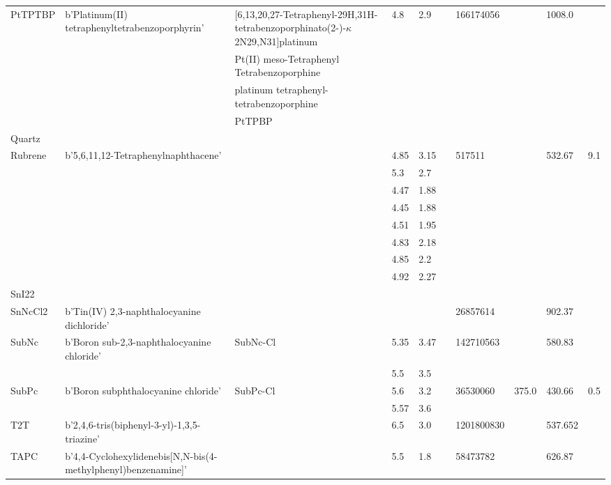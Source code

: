 \documentclass[../thesis.tex]{subfiles}
\begin{document}
\begin{landscape}
\begin{longtable}{| p{} | p{} | p{} | p{} | p{} | p{} | p{} | p{} | p{} | p{} | }
 \hline 
PtTPTBP & b'Platinum(II) tetraphenyltetrabenzoporphyrin' & [6,13,20,27-Tetraphenyl-29H,31H-tetrabenzoporphinato(2-)-$\kappa$2N29,N31]platinum & 4.8 & 2.9 &  & 166174056 &  & 1008.0 &  \\ 
 & & Pt(II) meso-Tetraphenyl Tetrabenzoporphine &  &  &  &  & & & \\ 
 & & platinum tetraphenyl-tetrabenzoporphine &  &  &  &  & & & \\ 
 & & PtTPBP &  &  &  &  & & & \\ 
 
 \hline 
Quartz &  &  &  &  &  &  &  &  &  \\ 
 
 \hline 
Rubrene & b'5,6,11,12-Tetraphenylnaphthacene' &  & 4.85 & 3.15 &  & 517511 &  & 532.67 & 9.1 \\ 
 & &  & 5.3 & 2.7 &  &  & & & \\ 
 & &  & 4.47 & 1.88 &  &  & & & \\ 
 & &  & 4.45 & 1.88 &  &  & & & \\ 
 & &  & 4.51 & 1.95 &  &  & & & \\ 
 & &  & 4.83 & 2.18 &  &  & & & \\ 
 & &  & 4.85 & 2.2 &  &  & & & \\ 
 & &  & 4.92 & 2.27 &  &  & & & \\ 
 
 \hline 
SnI22 &  &  &  &  &  &  &  &  &  \\ 
 
 \hline 
SnNcCl2 & b'Tin(IV) 2,3-naphthalocyanine dichloride' &  &  &  &  & 26857614 &  & 902.37 &  \\ 
 
 \hline 
SubNc & b'Boron sub-2,3-naphthalocyanine chloride' & SubNc-Cl & 5.35 & 3.47 &  & 142710563 &  & 580.83 &  \\ 
 & &  & 5.5 & 3.5 &  &  & & & \\ 
 
 \hline 
SubPc & b'Boron subphthalocyanine chloride' & SubPc-Cl & 5.6 & 3.2 &  & 36530060 & 375.0 & 430.66 & 0.5 \\ 
 & &  & 5.57 & 3.6 &  &  & & & \\ 
 
 \hline 
T2T & b'2,4,6-tris(biphenyl-3-yl)-1,3,5-triazine' &  & 6.5 & 3.0 &  & 1201800830 &  & 537.652 &  \\ 
 
 \hline 
TAPC & b'4,4-Cyclohexylidenebis[N,N-bis(4-methylphenyl)benzenamine]' &  & 5.5 & 1.8 &  & 58473782 &  & 626.87 &  \\ 
 

\end{longtable}
\end{landscape}
\end{document}
